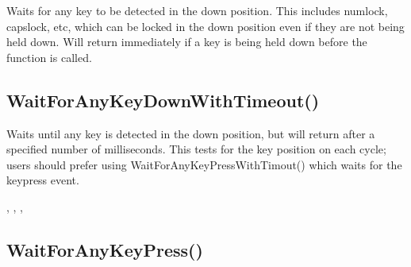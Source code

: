 \documentclass[letterpaper,10pt,english]{sphinxmanual}
\begin{document}
\sphinxAtStartPar
{}

\sphinxAtStartPar
Waits for any key to be detected in the down position.              This includes numlock, capslock, etc, which can be locked              in the down position even if they are not being held              down.  Will return immediately if a key is being held              down before the function is called.

\sphinxAtStartPar
{}

\sphinxAtStartPar
{}

\ignorespaces 

\subsection{WaitForAnyKeyDownWithTimeout()}
\label{\detokenize{reference/peblenvironment:waitforanykeydownwithtimeout}}\label{\detokenize{reference/peblenvironment:index-72}}
\sphinxAtStartPar
{}

\sphinxAtStartPar
Waits until any key is detected in the down position, but will return   after a specified number of milliseconds.  This tests for the key position on each cycle; users should prefer using WaitForAnyKeyPressWithTimout() which waits for the keypress event.

\sphinxAtStartPar
{}

\begin{sphinxVerbatim}[commandchars=\\\{\}]
\end{sphinxVerbatim}

\sphinxAtStartPar
{}

\sphinxAtStartPar
{}, ,  , 

\ignorespaces 

\subsection{WaitForAnyKeyPress()}
\label{\detokenize{reference/peblenvironment:waitforanykeypress}}\label{\detokenize{reference/peblenvironment:index-73}}
\sphinxAtStartPar
{}
\end{document}
